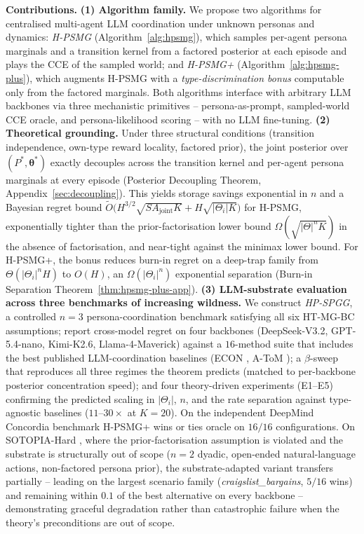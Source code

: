 ﻿\documentclass{article}
\def\textsuperscript#1{#1}%
\begin{document}
\textbf{Contributions.} \textbf{(1) Algorithm family.} We propose two algorithms for centralised multi-agent LLM coordination under unknown personas and dynamics: \emph{H-PSMG} (Algorithm~\ref{alg:hpsmg}), which samples per-agent persona marginals and a transition kernel from a factored posterior at each episode and plays the CCE of the sampled world; and \emph{H-PSMG\textsuperscript{+}} (Algorithm~\ref{alg:hpsmg-plus}), which augments H-PSMG with a \emph{type-discrimination bonus} computable only from the factored marginals. Both algorithms interface with arbitrary LLM backbones via three mechanistic primitives -- persona-as-prompt, sampled-world CCE oracle, and persona-likelihood scoring -- with no LLM fine-tuning. \textbf{(2) Theoretical grounding.} Under three structural conditions (transition independence, own-type reward locality, factored prior), the joint posterior over $(P^*, \boldsymbol\theta^*)$ exactly decouples across the transition kernel and per-agent persona marginals at every episode (Posterior Decoupling Theorem, Appendix~\ref{sec:decoupling}). This yields storage savings exponential in $n$ and a Bayesian regret bound $\tilde O\!\big(H^{3/2}\sqrt{SA_{\mathrm{joint}}K} + H\sqrt{|\Theta_i|K}\big)$ for H-PSMG, exponentially tighter than the prior-factorisation lower bound $\Omega(\sqrt{|\Theta|^n K})$ in the absence of factorisation, and near-tight against the minimax lower bound. For H-PSMG\textsuperscript{+}, the bonus reduces burn-in regret on a deep-trap family from $\Theta(|\Theta_i|^n H)$ to $O(H)$, an $\Omega(|\Theta_i|^n)$ exponential separation (Burn-in Separation Theorem~\ref{thm:hpsmg-plus-app}). \textbf{(3) LLM-substrate evaluation across three benchmarks of increasing wildness.} We construct \emph{HP-SPGG}, a controlled $n{=}3$ persona-coordination benchmark satisfying all six HT-MG-BC assumptions; report cross-model regret on four backbones (DeepSeek-V3.2, GPT-5.4-nano, Kimi-K2.6, Llama-4-Maverick) against a $16$-method suite that includes the best published LLM-coordination baselines (ECON \citep{yang2025econ}, A-ToM \citep{xu2026atom}); a $\beta$-sweep that reproduces all three regimes the theorem predicts (matched to per-backbone posterior concentration speed); and four theory-driven experiments (E1--E5) confirming the predicted scaling in $|\Theta_i|$, $n$, and the rate separation against type-agnostic baselines ($11$--$30\times$ at $K{=}20$). On the independent DeepMind Concordia benchmark \citep{vezhnevets2023concordia} H-PSMG\textsuperscript{+} wins or ties oracle on $16/16$ configurations. On SOTOPIA-Hard \citep{zhou2024sotopia}, where the prior-factorisation assumption is violated and the substrate is structurally out of scope ($n{=}2$ dyadic, open-ended natural-language actions, non-factored persona prior), the substrate-adapted variant transfers partially -- leading on the largest scenario family (\emph{craigslist\_bargains}, $5/16$ wins) and remaining within $0.1$ of the best alternative on every backbone -- demonstrating graceful degradation rather than catastrophic failure when the theory's preconditions are out of scope.
\end{document}
